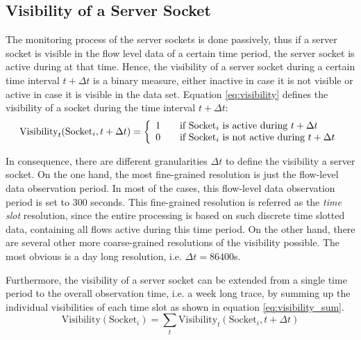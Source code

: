 \subsection{Visibility of a Server Socket\label{subsection:visibility}}

The monitoring process of the server sockets is done passively, thus if a server socket is visible in the flow level data of a certain time period, the server socket is active during at that time. Hence, the visibility of a server socket during a certain time interval $t+\Delta{t}$ is a binary measure, either inactive in case it is not visible or active in case it is visible in the data set. Equation \ref{eq:visibility} defines the visibility of a socket during the time interval $t+\Delta{t}$: 
\begin{equation}
	\text{Visibility}_t(\text{Socket}_i,t+\Delta{t}) = \left\{ 
	\begin{array}{l l}
		1 & \quad \text{if $\text{Socket}_i$ is active during $t+\Delta{t}$}\\
		0 & \quad \text{if $\text{Socket}_i$ is not active during $t+\Delta{t}$}\\
	\end{array}
	\right. 
	\label{eq:visibility} 
\end{equation}

In consequence, there are different granularities $\Delta{t}$ to define the visibility a server socket. On the one hand, the most fine-grained resolution is just the flow-level data observation period. In most of the cases, this flow-level data observation period is set to 300 seconds. This fine-grained resolution is referred as the \emph{time slot} resolution, since the entire processing is based on such discrete time slotted data, containing all flows active during this time period. 
On the other hand, there are several other more coarse-grained resolutions of the visibility possible. The most obvious is a day long resolution, i.e. $\Delta{t} = 86400$s.

Furthermore, the visibility of a server socket can be extended from a single time period to the overall observation time, i.e. a week long trace, by summing up the individual visibilities of each time slot as shown in equation \ref{eq:visibility_sum}.
\begin{equation}
	\text{Visibility}(\text{Socket}_i) = \sum_{t} \text{Visibility}_t(\text{Socket}_i,t+\Delta{t})
	\label{eq:visibility_sum} 
\end{equation}

